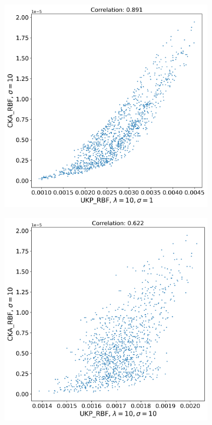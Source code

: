 \documentclass[11pt]{article}
\theoremstyle{plain}
\begin{document}
\begin{figure}[!h]
    \vspace{0.5cm}  %
    
    \begin{subfigure}[b]{0.45\textwidth}
        \includegraphics[width=\textwidth]{Appendix figures/mnist_experiments/Correlation/Correlation plot for CKA_dist_RBF_1.000000e+01 and UKP_dist_RBF_1.000000e+01_1.000000e+00.png}
    \end{subfigure}
    \hfill
    \begin{subfigure}[b]{0.45\textwidth}
        \includegraphics[width=\textwidth]{Appendix figures/mnist_experiments/Correlation/Correlation plot for CKA_dist_RBF_1.000000e+01 and UKP_dist_RBF_1.000000e+01_1.000000e+01.png}
    \end{subfigure}
    

\end{figure}
\end{document}
